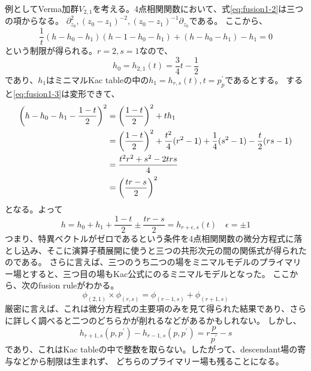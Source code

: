 \documentclass[11pt, aps, longbibliography]{article}
\numberwithin{equation}{section}
\begin{document}
        例としてVerma加群$V_{2,1}$を考える。4点相関関数において、式\eqref{eq:fusion1-2}は三つの項からなる。
        $\partial_{z_0}^2, (z_0-z_1)^{-2}, (z_0-z_1)^{-1}\partial_{z_0}$である。
        ここから、
        \begin{equation}\label{eq:fusion1-3}
            \frac{1}{t}(h-h_0-h_1)(h-1-h_0-h_1)+(h-h_0-h_1)-h_1 = 0
        \end{equation}
        という制限が得られる。$r=2,s=1$なので、
        \begin{equation}\label{eq:fusion1-4}
            h_0 = h_{2,1}(t) = \frac{3}{4}t-\frac{1}{2}
        \end{equation}
        であり、$h_1$はミニマルKac tableの中の$h_1 = h_{r,s}(t),t=p_p^\prime$であるとする。
        すると\eqref{eq:fusion1-3}は変形できて、
        \begin{align}\label{eq:fusion1-5}
            \left( h-h_0-h_1-\frac{1-t}{2} \right)^2 &= \left( \frac{1-t}{2} \right)^2 + th_1 \notag \\
            &= \left( \frac{1-t}{2} \right)^2 + \frac{t^2}{4}(r^2-1) + \frac{1}{4}(s^2-1) - \frac{t}{2}(rs-1) \notag \\
            &= \frac{t^2r^2+s^2-2trs}{4} \notag \\
            &= \left( \frac{tr-s}{2} \right)^2
        \end{align}
        となる。よって
        \begin{equation}\label{eq:fusion1-6}
            h = h_0 + h_1 + \frac{1-t}{2} \pm \frac{tr-s}{2} = h_{r+\epsilon,s}(t) \quad \epsilon = \pm1
        \end{equation}
        つまり、特異ベクトルがゼロであるという条件を4点相関関数の微分方程式に落とし込み、そこに演算子積展開に使うと三つの共形次元の間の関係式が得られたのである。
        さらに言えば、三つのうち二つの場をミニマルモデルのプライマリー場とすると、三つ目の場もKac公式にのるミニマルモデルとなった。
        ここから、次のfusion ruleがわかる。
        \begin{equation}\label{eq:fusion1-7}
            \phi_{(2,1)}\times \phi_{(r,s)} = \phi_{(r-1,s)} + \phi_{(r+1,s)}
        \end{equation}
        厳密に言えば、これは微分方程式の主要項のみを見て得られた結果であり、さらに詳しく調べると二つのどちらかが削れるなどがあるかもしれない。
        しかし、
        \begin{equation}\label{eq:fusion1-8}
            h_{r+1,s}(p,p^\prime) - h_{r-1,s}(p,p^\prime) = r\frac{p}{p^\prime}-s
        \end{equation}
        であり、これはKac tableの中で整数を取らない。したがって、descendant場の寄与などから制限は生まれず、
        どちらのプライマリー場も残ることになる。
\end{document}

